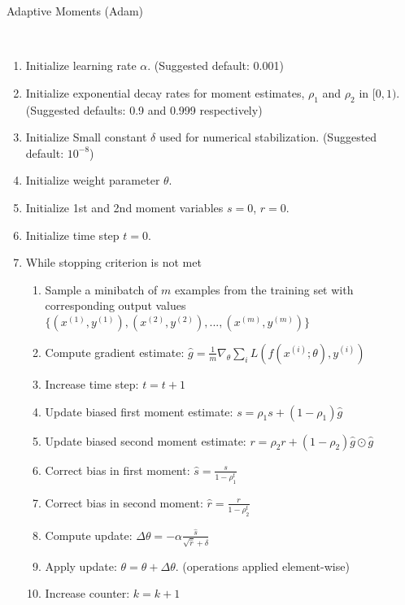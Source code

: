 \begin{algorithm}
	\caption{Adaptive Moments (Adam) \cite{goodfellow2016deep}}\label{alg:adam}
	\begin{algorithmic}
		\\
		\begin{enumerate}
			\item Initialize learning rate $\alpha$. (Suggested default: 0.001)
			\item Initialize exponential decay rates for moment estimates, $\rho_1$ and $\rho_2$ in $[0,1)$.
			(Suggested defaults: 0.9 and 0.999 respectively)		
			\item Initialize Small constant $\delta$ used for numerical stabilization. (Suggested default: $10^{-8}$)
			\item Initialize weight parameter $\theta$.
			\item Initialize 1st and 2nd moment variables $s = 0$, $r = 0$.
			\item Initialize time step $t = 0$.
			\item While stopping criterion is not met
			\begin{enumerate}[label=\emph{\alph*})]
				\item Sample a minibatch of $m$ examples from the training set with corresponding output values
				$\{(x^{(1)}, y^{(1)}), (x^{(2)}, y^{(2)}), ..., (x^{(m)}, y^{(m)})\}$
				\item Compute gradient estimate: $\hat{g} = \frac{1}{m} \nabla_\theta \sum_i L(f(x^{(i)};\theta), y^{(i)})$
				\item Increase time step: $t = t + 1$
				\item Update biased first moment estimate: $s = \rho_1 s + (1-\rho_1) \hat{g}$
				\item Update biased second moment estimate: $r = \rho_2 r + (1-\rho_2) \hat{g} \odot \hat{g}$
				\item Correct bias in first moment: $\hat{s} = \frac{s}{1 - \rho_1^t}$
				\item Correct bias in second moment: $\hat{r} = \frac{r}{1 - \rho_2^t}$
				\item Compute update: $\Delta \theta = - \alpha \frac{\hat{s} }{\sqrt{\hat{r}} + \delta}$
				\item Apply update: $\theta = \theta + \Delta \theta$. (operations applied element-wise)
				\item Increase counter: $k = k + 1$
			\end{enumerate}
		\end{enumerate}
	\end{algorithmic}
\end{algorithm}

